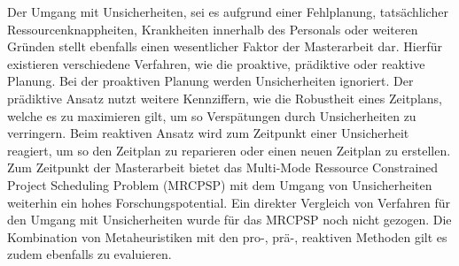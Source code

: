 Der Umgang mit Unsicherheiten, sei es aufgrund einer Fehlplanung, tatsächlicher Ressourcenknappheiten, Krankheiten innerhalb des Personals oder weiteren Gründen stellt ebenfalls einen wesentlicher Faktor der Masterarbeit dar. Hierfür existieren verschiedene Verfahren, wie die proaktive, prädiktive oder reaktive Planung. Bei der proaktiven Planung werden Unsicherheiten ignoriert. Der prädiktive Ansatz nutzt weitere Kennziffern, wie die Robustheit eines Zeitplans, welche es zu maximieren gilt, um so Verspätungen durch Unsicherheiten zu verringern. Beim reaktiven Ansatz wird zum Zeitpunkt einer Unsicherheit reagiert, um so den Zeitplan zu reparieren oder einen neuen Zeitplan zu erstellen. \cite[vgl.][S. 404 f.]{brcic_resource_2012} \\

Zum Zeitpunkt der Masterarbeit bietet das Multi-Mode Ressource Constrained Project Scheduling Problem (MRCPSP) mit dem Umgang von Unsicherheiten weiterhin ein hohes Forschungspotential. Ein direkter Vergleich von Verfahren für den Umgang mit Unsicherheiten wurde für das MRCPSP noch nicht gezogen. Die Kombination von Metaheuristiken mit den pro-, prä-, reaktiven Methoden gilt es zudem ebenfalls zu evaluieren. 